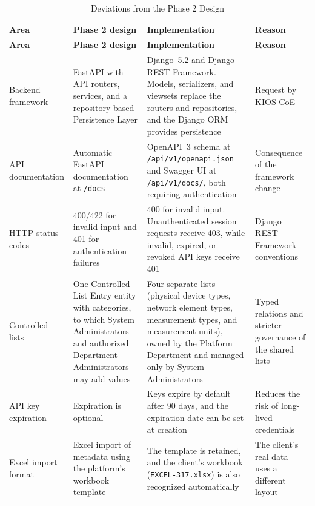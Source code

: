 \documentclass[11pt,a4paper]{article}
\begin{document}
\begin{longtable}{P{2.7cm} P{4.2cm} P{4.6cm} P{3.7cm}}
\caption{Deviations from the Phase 2 Design}
\label{tab:phase3_deviations}\\

\toprule
\textbf{Area} & \textbf{Phase 2 design} & \textbf{Implementation} & \textbf{Reason} \\
\midrule
\endfirsthead

\toprule
\textbf{Area} & \textbf{Phase 2 design} & \textbf{Implementation} & \textbf{Reason} \\
\midrule
\endhead

\bottomrule
\endfoot

Backend framework &
FastAPI with API routers, services, and a repository-based
Persistence Layer &
Django~5.2 and Django REST Framework. Models, serializers, and viewsets
replace the routers and repositories, and the Django ORM provides
persistence &
Request by KIOS CoE \\

API documentation &
Automatic FastAPI documentation at \texttt{/docs} &
OpenAPI~3 schema at \texttt{/api/v1/openapi.json} and Swagger UI at
\texttt{/api/v1/docs/}, both requiring authentication &
Consequence of the framework change \\

HTTP status codes &
400/422 for invalid input and 401 for authentication failures &
400 for invalid input. Unauthenticated session requests receive 403,
while invalid, expired, or revoked API keys receive 401 &
Django REST Framework conventions \\

Controlled lists &
One Controlled List Entry entity with categories, to which System
Administrators and authorized Department Administrators may add values &
Four separate lists (physical device types, network element types,
measurement types, and measurement units), owned by the Platform
Department and managed only by System Administrators &
Typed relations and stricter governance of the shared lists \\

API key expiration &
Expiration is optional &
Keys expire by default after 90 days, and the expiration date can
be set at creation &
Reduces the risk of long-lived credentials \\

Excel import format &
Excel import of metadata using the platform's workbook template &
The template is retained, and the client's workbook
(\texttt{EXCEL-317.xlsx}) is also recognized automatically &
The client's real data uses a different layout \\


\end{longtable}
\end{document}
